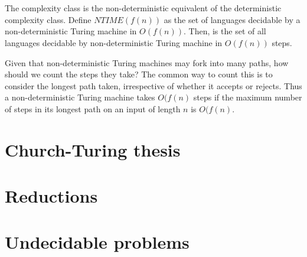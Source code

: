 \section{}
  The  complexity class is the non-deterministic equivalent of the deterministic  complexity class.
  Define \( NTIME(f(n)) \) as the set of languages decidable by a non-deterministic Turing machine in \( O(f(n)) \).
  Then,  is the set of all languages decidable by non-deterministic Turing machine in \( O(f(n)) \) steps.

  Given that non-deterministic Turing machines may fork into many paths, how should we count the steps they take?
  The common way to count this is to consider the longest path taken, irrespective of whether it accepts or rejects.
  Thus a non-deterministic Turing machine takes \(O(f(n)\) steps if the maximum number of steps in its longest path on an input of length \(n\) is \(O(f(n)\).

\section{Church-Turing thesis}

\section{Reductions}


\section{}

\section{Undecidable problems}

